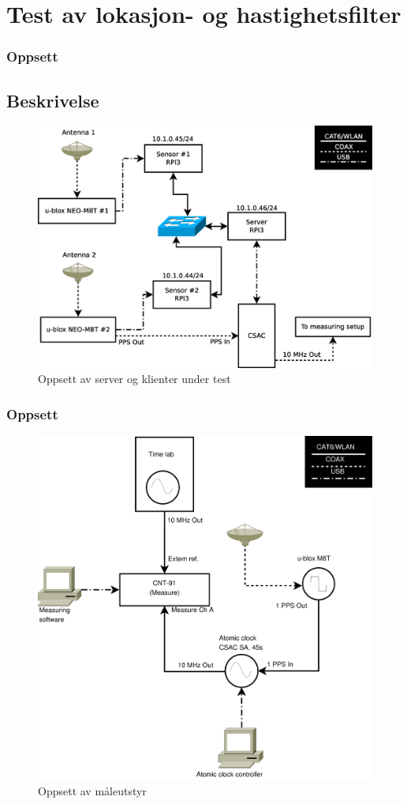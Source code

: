 \documentclass[xcolor=table]{beamer}
\begin{document}
\section{Test av lokasjon- og hastighetsfilter}
\begin{frame}
\frametitle{Oppsett}
  \subsection{Beskrivelse}
      \begin{figure}
        \includegraphics[scale=0.25]{thesis/graphics/server_layout.eps}
        \caption{Oppsett av server og klienter under test}
      \end{figure}
\end{frame}

\begin{frame}
\frametitle{Oppsett}
      \begin{figure}
        \includegraphics[scale=0.25]{thesis/graphics/measure_setup.pdf}
        \caption{Oppsett av måleutstyr}
      \end{figure}
\end{frame}
\end{document}
